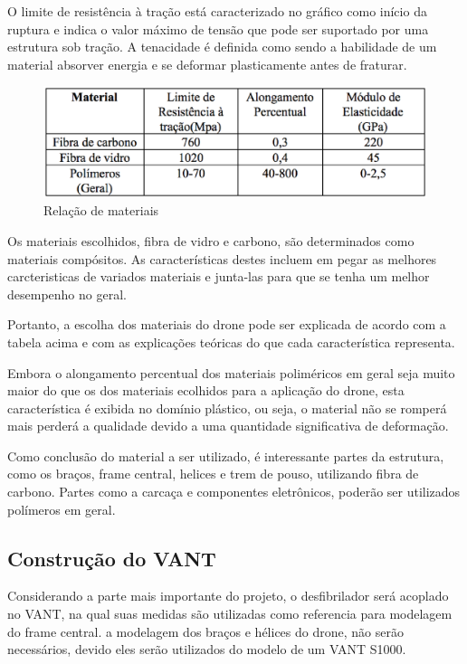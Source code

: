
O limite de resistência à tração está caracterizado no gráfico como início da ruptura e indica o valor máximo de tensão que pode ser suportado por uma estrutura sob tração.
A tenacidade é definida como sendo a habilidade de um material absorver energia e se deformar plasticamente antes de fraturar.

\begin{figure}[h!]
    \centering
      \includegraphics[keepaspectratio=true,scale=0.5]{figuras/graficoRelacao.eps}
    \caption{ Relação de materiais}
    \label{fig:graficoRelacao}
\end{figure}

Os materiais escolhidos, fibra de vidro e carbono, são determinados como materiais compósitos. As características destes incluem em pegar as melhores carcteristicas de variados materiais e junta-las para que se tenha um melhor desempenho no geral. 

Portanto, a escolha dos materiais do drone pode ser explicada de acordo com a tabela acima e com as explicações teóricas do que cada característica representa. 

Embora o alongamento percentual dos materiais poliméricos em geral seja muito maior do que os dos materiais ecolhidos para a aplicação do drone, esta característica é exibida no domínio plástico, ou seja, o material não se romperá mais perderá a qualidade devido a uma quantidade significativa de deformação.

Como conclusão do material a ser utilizado, é interessante partes da estrutura, como os braços, frame central, helices e trem de pouso, utilizando fibra de carbono. Partes como a carcaça e componentes eletrônicos, poderão ser utilizados polímeros em geral. 

\subsection{Construção do VANT}

Considerando a parte mais importante do projeto, o desfibrilador será acoplado no VANT, na qual suas medidas são utilizadas como referencia para modelagem do frame central. a modelagem dos  braços e hélices do drone, não serão necessários, devido eles serão utilizados do modelo de um VANT S1000.

